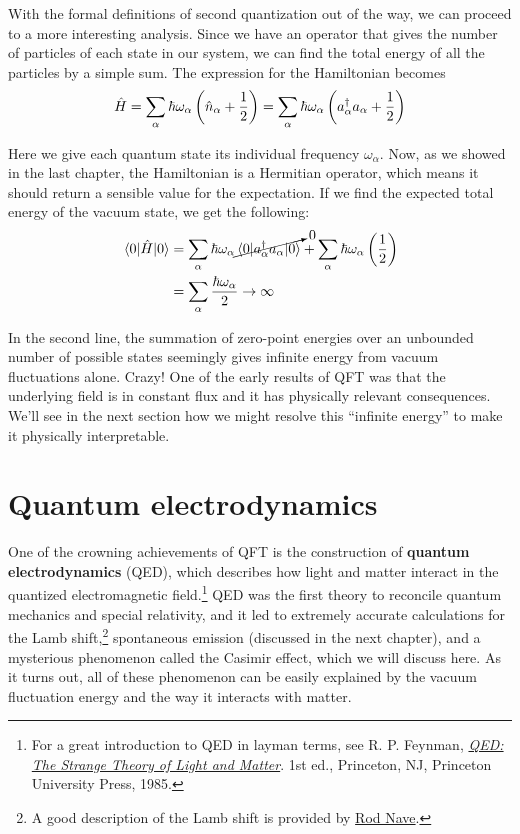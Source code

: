With the formal definitions of second quantization out of the way, we can proceed to a more interesting analysis. Since we have an operator that gives the number of particles of each state in our system, we can find the total energy of all the particles by a simple sum. The expression for the Hamiltonian becomes
\begin{equation}
	\hat{H} = \sum_{\alpha} \hbar\omega_{\alpha} \left(\hat{n}_{\alpha} + \frac{1}{2} \right) = \sum_{\alpha} \hbar\omega_{\alpha} \left(a^{\dagger}_{\alpha}a_{\alpha} + \frac{1}{2}\right)
\end{equation}


Here we give each quantum state its individual frequency $\omega_{\alpha}$. Now, as we showed in the last chapter, the Hamiltonian is a Hermitian operator, which means it should return a sensible value for the expectation. If we find the expected total energy of the vacuum state, we get the following:
\begin{align*}
	\mel{0}{\hat{H}}{0} &= \sum_{\alpha} \hbar\omega_{\alpha} \cancelto{0}{\mel{0}{a^{\dagger}_{\alpha}a_{\alpha}}{0}} + \sum_{\alpha}\hbar\omega_{\alpha}\left(\frac{1}{2}\right) \\
	&= \sum_{\alpha} \frac{\hbar\omega_{\alpha}}{2} \rightarrow \infty
\end{align*}

In the second line, the summation of zero-point energies over an unbounded number of possible states seemingly gives infinite energy from vacuum fluctuations alone. Crazy! One of the early results of QFT was that the underlying field is in constant flux and it has physically relevant consequences. We'll see in the next section how we might resolve this ``infinite energy'' to make it physically interpretable.



\section{Quantum electrodynamics}
One of the crowning achievements of QFT is the construction of \textbf{quantum electrodynamics} (QED), which describes how light and matter interact in the quantized electromagnetic field.\footnote{For a great introduction to QED in layman terms, see R. P. Feynman, \href{https://en.wikipedia.org/wiki/QED:_The_Strange_Theory_of_Light_and_Matter}{\emph{QED: The Strange Theory of Light and Matter}}. 1st ed., Princeton, NJ, Princeton University Press, 1985.} QED was the first theory to reconcile quantum mechanics and special relativity, and it led to extremely accurate calculations for the Lamb shift,\footnote{A good description of the Lamb shift is provided by \href{http://hyperphysics.phy-astr.gsu.edu/hbase/quantum/lamb.html}{Rod Nave}.} spontaneous emission (discussed in the next chapter), and a mysterious phenomenon called the Casimir effect, which we will discuss here. As it turns out, all of these phenomenon can be easily explained by the vacuum fluctuation energy and the way it interacts with matter.

